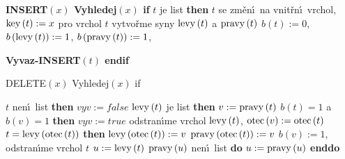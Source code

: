 {\bf INSERT$\left(x\right)$\newline 
Vyhledej$\left(x\right)$\newline 
if} $t$ je list {\bf then}\newline 
\phantom{---}$t$ se zm\v en\'\i\ na vnit\v rn\'\i\ vrchol, $\operatorname{key}\left(t\right):=x$\newline 
\phantom{---}pro vrchol $t$ vytvo\v rme syny $\operatorname{levy}\left(t\right)$ a $\operatorname{pravy}\left(t\right)$\newline 
\phantom{---}$b\left(t\right):=0$, $b\left(\operatorname{levy}\left(t\right)\right):=1$, $b\left(\operatorname{pravy}\left(t\right)\right):=1$, {\bf Vyvaz-INSERT$\left(t\right)$\newline
endif
\medskip

DELETE$\left(x\right)$\newline 
Vyhledej$\left(x\right)$\newline 
if} $t$ nen\'\i\ list {\bf then}\newline 
\phantom{---}$vyv:=false$ \newline 
\phantom{---}{\bf if} $\operatorname{levy}\left(t\right)$ je list {\bf then}\newline 
\phantom{------}$v:=\operatorname{pravy}\left(t\right)$\newline 
\phantom{------}{\bf if} $b\left(t\right)=1$ a $b\left(v\right)=1$ {\bf then}\newline 
\phantom{---------}$vyv:=true$\newline 
\phantom{------}{\bf endif}\newline 
\phantom{------}odstran\'\i me vrchol $\operatorname{levy}\left(t\right)$, $\operatorname{otec}\left(v\right):=\operatorname{otec}\left(t\right)$\newline 
\phantom{------}{\bf if} $t=\operatorname{levy}\left(\operatorname{otec}\left(t\right)\right)$ {\bf then}\newline 
\phantom{---------}$\operatorname{levy}\left(\operatorname{otec}\left(t\right)\right):=v$\newline 
\phantom{------}{\bf else}\newline 
\phantom{---------}$\operatorname{pravy}\left(\operatorname{otec}\left(t\right)\right):=v$\newline 
\phantom{------}{\bf endif}\newline 
\phantom{------}$b\left(v\right):=1$, odstran\'\i me vrchol $t$\newline 
\phantom{---}{\bf else}\newline 
\phantom{------}$u:=\operatorname{levy}\left(t\right)$\newline 
\phantom{------}{\bf while} $\operatorname{pravy}\left(u\right)$ nen\'\i\ list {\bf do} $u:=\operatorname{pravy}\left(u\right)$ {\bf enddo}\newline 
